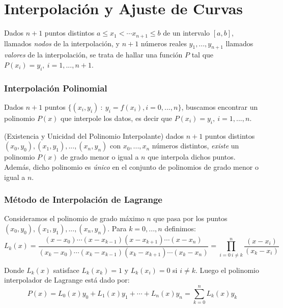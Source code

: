 \hypertarget{interpolaciuxf3n-y-ajuste-de-curvas}{%
\section{Interpolación y Ajuste de
Curvas}\label{interpolaciuxf3n-y-ajuste-de-curvas}}

Dados \(n+1\) puntos distintos \(a \leq x_1 < \cdots x_{n+1} \leq b\) de
un intervalo \([a,b]\), llamados \emph{nodos} de la interpolación, y
\(n+1\) números reales \(y_1,...,y_{n+1}\) llamados \emph{valores} de la
interpolación, se trata de hallar una función \(P\) tal que
\(P(x_i) = y_i,\  i=1,...,n+1\).

\hypertarget{interpolaciuxf3n-polinomial}{%
\subsubsection{Interpolación
Polinomial}\label{interpolaciuxf3n-polinomial}}

Dados \(n+1\) puntos \(\{(x_i, y_i)\  :\  y_i = f(x_i), i=0,...,n\}\),
buscamos encontrar un polinomio \(P(x)\) que interpole los datos, es
decir que \(P(x_i) = y_i,\  i=1,...,n\).

\Teorema (Existencia y Unicidad del Polinomio Interpolante) dados
\(n+1\) puntos distintos \((x_0, y_0), (x_1, y_1), ..., (x_n, y_n)\) con
\(x_0, ..., x_n\) números distintos, \emph{existe} un polinomio \(P(x)\)
de grado menor o igual a \(n\) que interpola dichos puntos. Además,
dicho polinomio es \emph{único} en el conjunto de polinomios de grado
menor o igual a \(n\).

\hypertarget{muxe9todo-de-interpolaciuxf3n-de-lagrange}{%
\subsubsection{Método de Interpolación de
Lagrange}\label{muxe9todo-de-interpolaciuxf3n-de-lagrange}}

Consideramos el polinomio de grado máximo \(n\) que pasa por los puntos
\((x_0, y_0), (x_1, y_1), ..., (x_n, y_n)\). Para \(k=0,...,n\)
definimos: \[
L_k(x) = \frac{(x-x_0) \cdots (x-x_{k-1})(x-x_{k+1}) \cdots (x-x_n)}{(x_k-x_0)
\cdots (x_k-x_{k-1})(x_k-x_{k+1}) \cdots (x_k-x_n)}
= \prod_{i=0\  i\neq k}^n \frac{(x - x_i)}{(x_k - x_i)}
\]

Donde \(L_k(x)\) satisface \(L_k(x_k) = 1\) y \(L_k(x_i) = 0\) si
\(i \neq k\). Luego el polinomio interpolador de Lagrange está dado por:
\[
P(x) = L_0(x) y_0 + L_1(x) y_1 + \cdots + L_n(x) y_n
= \sum_{k=0}^n L_k(x) y_k
\]

